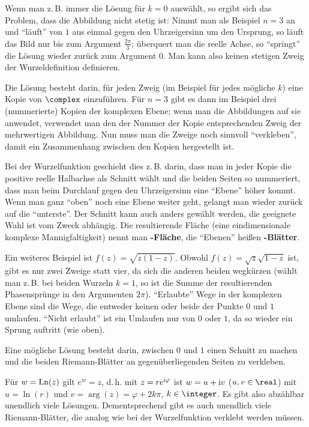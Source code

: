 Wenn man z.\,B. immer die Lösung für $k = 0$ auswählt, so ergibt sich das
Problem, dass die Abbildung nicht stetig ist:
Nimmt man als Beispiel $n = 3$ an und "`läuft"' von $1$ aus
einmal gegen den Uhrzeigersinn um den Ursprung, so läuft das Bild nur bis
zum Argument $\frac{2\pi}{3}$;
überquert man die reelle Achse, so "`springt"' die Lösung wieder zurück
zum Argument $0$.
Man kann also keinen stetigen Zweig der Wurzeldefinition definieren.

Die Lösung besteht darin, für jeden Zweig (im Beispiel für jedes mögliche $k$)
eine Kopie von $\complex$ einzuführen.
Für $n = 3$ gibt es dann im Beispiel drei (nummerierte) Kopien der
komplexen Ebene;
wenn man die Abbildungen auf sie anwendet, verwendet man den der Nummer der
Kopie entsprechenden Zweig der mehrwertigen Abbildung.
Nun muss man die Zweige noch sinnvoll "`verkleben"', damit ein Zusammenhang
zwischen den Kopien hergestellt ist.

Bei der Wurzelfunktion geschieht dies z.\,B. darin, dass man in jeder Kopie
die positive reelle Halbachse als Schnitt wählt und die beiden Seiten
so nummeriert, dass man beim Durchlauf gegen den Uhrzeigersinn eine "`Ebene"'
höher kommt.
Wenn man ganz "`oben"' noch eine Ebene weiter geht, gelangt man wieder zurück
auf die "`unterste"'.
Der Schnitt kann auch anders gewählt werden, die geeignete Wahl ist vom Zweck
abhängig.
Die resultierende Fläche (eine eindimensionale komplexe Mannigfaltigkeit)
nennt man \textbf{-Fläche}, die "`Ebenen"' heißen
\textbf{-Blätter}.

\linie

Ein weiteres Beispiel ist $f(z) = \sqrt{z(1 - z)}$.
Obwohl $f(z) = \sqrt{z} \sqrt{1 - z}$ ist, gibt es nur zwei Zweige statt vier,
da sich die anderen beiden wegkürzen
(wählt man z.\,B. bei beiden Wurzeln $k = 1$, so ist die Summe der
resultierenden Phasensprünge in den Argumenten $2\pi$).
"`Erlaubte"' Wege in der komplexen Ebene sind die Wege, die entweder keinen
oder beide der Punkte $0$ und $1$ umlaufen.
"`Nicht erlaubt"' ist ein Umlaufen nur von $0$ oder $1$, da
so wieder ein Sprung auftritt (wie oben).

Eine mögliche Lösung besteht darin, zwischen $0$ und $1$ einen Schnitt zu
machen und die beiden Riemann-Blätter an gegenüberliegenden Seiten zu
verkleben.

\linie

Für $w = \operatorname{Ln}(z)$ gilt $e^w = z$, d.\,h. mit $z = r e^{\mathrm{i}\varphi}$ ist
$w = u + \mathrm{i} v$ ($u, v \in \real$) mit $u = \ln(r)$ und
$v = \arg(z) = \varphi + 2k\pi$, $k \in \integer$.
Es gibt also abzählbar unendlich viele Lösungen.
Dementsprechend gibt es auch unendlich viele Riemann-Blätter, die analog wie
bei der Wurzelfunktion verklebt werden müssen.

